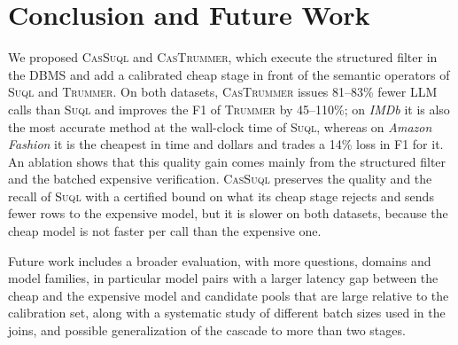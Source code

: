 \documentclass[sigconf]{acmart}
\begin{document}
\section{Conclusion and Future Work}
\label{sec:conclusion}

We proposed \textsc{CasSuql} and \textsc{CasTrummer}, which execute the structured filter in the DBMS and add a calibrated cheap stage in front of the semantic operators of \textsc{Suql} and \textsc{Trummer}. On both datasets, \textsc{CasTrummer} issues 81--83\% fewer LLM calls than \textsc{Suql} and improves the F1 of \textsc{Trummer} by 45--110\%; on \textit{IMDb} it is also the most accurate method at the wall-clock time of \textsc{Suql}, whereas on \textit{Amazon Fashion} it is the cheapest in time and dollars and trades a 14\% loss in F1 for it. An ablation shows that this quality gain comes mainly from the structured filter and the batched expensive verification. \textsc{CasSuql} preserves the quality and the recall of \textsc{Suql} with a certified bound on what its cheap stage rejects and sends fewer rows to the expensive model, but it is slower on both datasets, because the cheap model is not faster per call than the expensive one.

Future work includes a broader evaluation, with more questions, domains and model families, in particular model pairs with a larger latency gap between the cheap and the expensive model and candidate pools that are large relative to the calibration set, along with a systematic study of different batch sizes used in the joins, and possible generalization of the cascade to more than two stages.



\end{document}
